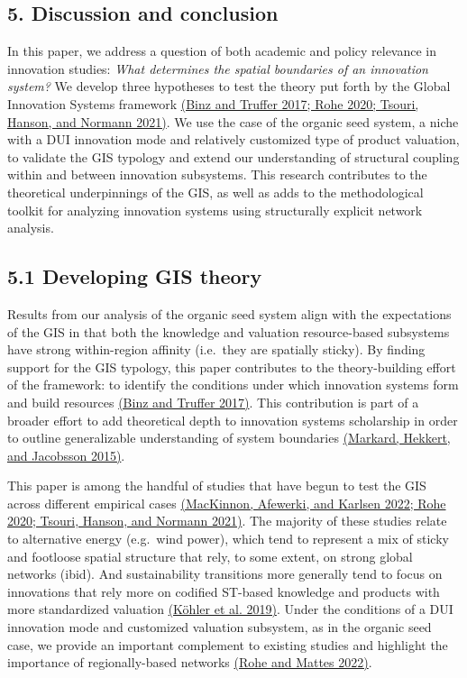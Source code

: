 \documentclass[twoside,12pt,final]{ucthesis-CA2012}
\begin{document}
\begin{ucmainmatter}
\hypertarget{discussion-and-conclusion-1}{%
\section{5. Discussion and conclusion}\label{discussion-and-conclusion-1}}

In this paper, we address a question of both academic and policy
relevance in innovation studies: \emph{What determines the spatial boundaries
of an innovation system?} We develop three hypotheses to test the theory
put forth by the Global Innovation Systems framework \href{https://www.zotero.org/google-docs/?tLDUtc}{(Binz and Truffer
2017; Rohe 2020; Tsouri, Hanson, and Normann
2021)}. We use the case of
the organic seed system, a niche with a DUI innovation mode and
relatively customized type of product valuation, to validate the GIS
typology and extend our understanding of structural coupling within and
between innovation subsystems. This research contributes to the
theoretical underpinnings of the GIS, as well as adds to the
methodological toolkit for analyzing innovation systems using
structurally explicit network analysis.

\hypertarget{developing-gis-theory}{%
\subsection{5.1 Developing GIS theory}\label{developing-gis-theory}}

Results from our analysis of the organic seed system align with the
expectations of the GIS in that both the knowledge and valuation
resource-based subsystems have strong within-region affinity (i.e.~they
are spatially sticky). By finding support for the GIS typology, this
paper contributes to the theory-building effort of the framework: to
identify the conditions under which innovation systems form and build
resources \href{https://www.zotero.org/google-docs/?b82Er7}{(Binz and Truffer
2017)}. This contribution is
part of a broader effort to add theoretical depth to innovation systems
scholarship in order to outline generalizable understanding of system
boundaries \href{https://www.zotero.org/google-docs/?0MJFcA}{(Markard, Hekkert, and Jacobsson
2015)}.

This paper is among the handful of studies that have begun to test the
GIS across different empirical cases \href{https://www.zotero.org/google-docs/?mG2X29}{(MacKinnon, Afewerki, and Karlsen
2022; Rohe 2020; Tsouri, Hanson, and Normann
2021)}. The majority of
these studies relate to alternative energy (e.g.~wind power), which tend
to represent a mix of sticky and footloose spatial structure that rely,
to some extent, on strong global networks (ibid). And sustainability
transitions more generally tend to focus on innovations that rely more
on codified ST-based knowledge and products with more standardized
valuation \href{https://www.zotero.org/google-docs/?SkrLVo}{(Köhler et al.
2019)}. Under the conditions
of a DUI innovation mode and customized valuation subsystem, as in the
organic seed case, we provide an important complement to existing
studies and highlight the importance of regionally-based networks \href{https://www.zotero.org/google-docs/?fJ6KFW}{(Rohe
and Mattes 2022)}.


\end{ucmainmatter}
\end{document}
